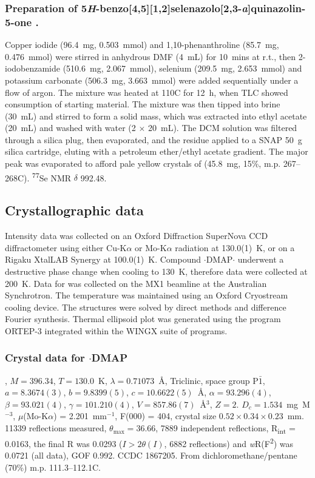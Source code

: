 \subsubsection[Preparation of \refcmpd{tetracycle}.]{Preparation of 5\emph{H}-benzo[4,5][1,2]selenazolo[2,3-\emph{a}]quinazolin-5-one .}

Copper iodide (96.4~mg, 0.503~mmol) and 1,10-phenanthroline (85.7~mg, 0.476~mmol) were stirred in anhydrous DMF (4~mL) for 10~mins at r.t., then 2-iodobenzamide (510.6~mg, 2.067~mmol), selenium (209.5~mg, 2.653~mmol) and potassium carbonate (506.3~mg, 3.663~mmol) were added sequentially under a flow of argon. 
The mixture was heated at 110\degree C for 12~h, when TLC showed consumption of starting material. 
The mixture was then tipped into brine (30~mL) and stirred to form a solid mass, which was extracted into ethyl acetate (20~mL) and washed with water (2 $\times$ 20~mL).
The DCM solution was filtered through a silica plug, then evaporated, and the residue applied to a SNAP 50~g silica cartridge, eluting with a petroleum ether/ethyl acetate gradient. 
The major peak was evaporated to afford pale yellow crystals of  (45.8~mg, 15\%, m.p. 267--268\degree C). \textsuperscript{77}Se NMR $\delta$ 992.48.

\subsection{Crystallographic data}
Intensity data was collected on an Oxford Diffraction SuperNova CCD diffractometer using either Cu-K$\alpha$ or Mo-K$\alpha$ radiation at 130.0(1)~K, or on a Rigaku XtalLAB Synergy at 100.0(1)~K. Compound $\cdot$DMAP$\cdot$ underwent a destructive phase change when cooling to 130~K, therefore data were collected at 200~K. Data for  was collected on the MX1 beamline at the Australian Synchrotron\autocite{Cowieson2015}. The temperature was maintained using an Oxford Cryostream cooling device. The structures were solved by direct methods and difference Fourier synthesis.\autocite{Sheldrick2015} Thermal ellipsoid plot was generated using the program ORTEP-3\autocite{Farrugia1997} integrated within the WINGX\autocite{Farrugia1999} suite of programs.  

\subsubsection{Crystal data for $\cdot$DMAP}
, $M=396.34$, $T=130.0$~K, $\lambda=0.71073$~\AA, Triclinic, space group P$\bar{1}$, $a = 8.3674(3)$, $b = 9.8399(5)$, $c =10.6622(5)$~\AA, $\alpha=93.296(4)$\degree, $\beta=93.021(4)$\degree, $\gamma=101.210(4)$\degree, $V=857.86(7)$~\AA$^{3}$, $Z = 2$.
$D_{c}= 1.534$~mg~M$^{-3}$, $\mu$(Mo-K$\alpha$) = 2.201~mm$^{-1}$, F(000) = 404, crystal size $0.52 \times 0.34 \times 0.23$~mm.
11339 reflections measured, $\theta_{\mathrm{max}}=36.66$\degree, 7889 independent reflections, R\textsubscript{int} = 0.0163, the final R was 0.0293 ($I > 2\theta(I)$, 6882 reflections) and \emph{w}R(F\textsuperscript{2}) was 0.0721 (all data), GOF 0.992. 
CCDC 1867205. 
From dichloromethane/pentane (70\%) m.p. 111.3--112.1\degree C.

